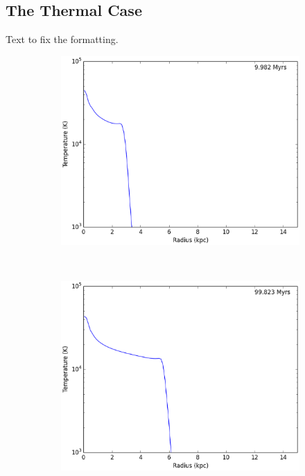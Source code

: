 \subsection{The Thermal Case}
\label{sec:thermalstromgren}

Text to fix the formatting.
\begin{figure}
        \centering
        \begin{subfigure}[b]{0.3\textwidth}
                \includegraphics[width=\textwidth]{graphics/ifrontThermal6400020Tempprofile.eps}
                \label{fig:stromgrenthermal10}
        \end{subfigure}
        ~ 
        \begin{subfigure}[b]{0.3\textwidth}
                \includegraphics[width=\textwidth]{graphics/ifrontThermal6400200Tempprofile.eps}

\end{subfigure}
\end{figure}
